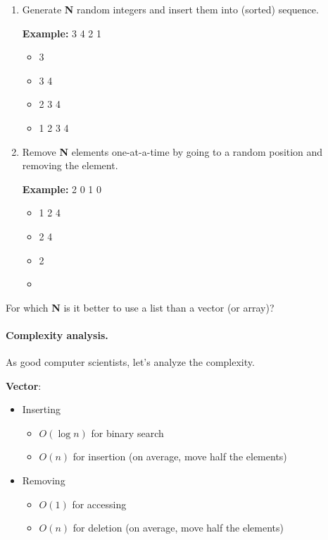 \documentclass[a4paper]{report}
\begin{document}
\begin{enumerate}
\item Generate {\bf N} random integers and insert them into (sorted)
      sequence.
      
      {\bf Example:} 3 4 2 1
      
      \begin{itemize}
        \item 3
        \item 3 4
        \item 2 3 4
        \item 1 2 3 4
      \end{itemize}

\item Remove {\bf N} elements one-at-a-time by going to a random position
      and removing the element.

      {\bf Example:} 2 0 1 0
      
      \begin{itemize}
        \item 1 2 4
        \item 2 4
        \item 2
        \item 
      \end{itemize}
\end{enumerate}

For which {\bf N} is it better to use a list than a vector (or array)?

 
\paragraph{Complexity analysis.} As good computer scientists, let's analyze
the complexity.  

{\bf Vector}:\\[-2em]
      \begin{itemize}
        \item Inserting\\[-2em]
          \begin{itemize}
            \item $O(\log n)$ for binary search
            \item $O(n)$ for insertion (on average, move half the elements)
          \end{itemize}
        \item Removing\\[-2em]
          \begin{itemize}
            \item $O(1)$ for accessing
            \item $O(n)$ for deletion (on average, move half the elements)
          \end{itemize}
      \end{itemize}
\end{document}

